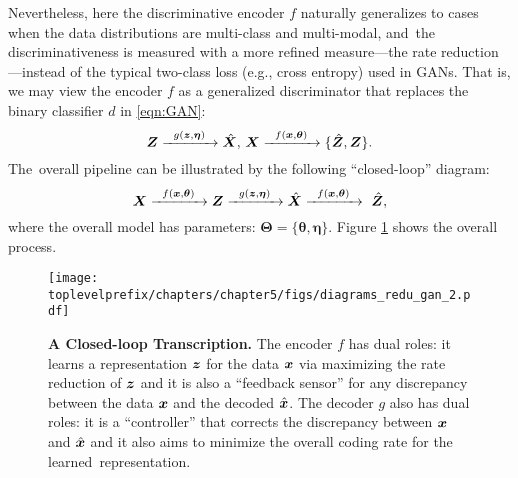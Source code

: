 \documentclass[../../book-main.tex]{subfiles}
\begin{document}
{Nevertheless, here the  discriminative encoder $f$ naturally generalizes to cases when the data distributions are multi-class and multi-modal, and~the discriminativeness is measured with a more refined measure---the rate reduction---instead of the typical two-class loss (e.g., cross entropy) used in GANs. That is, we may view the encoder $f$ as a generalized discriminator that replaces the binary classifier $d$ in \eqref{eqn:GAN}:
\begin{equation}
 \bm{Z} \xrightarrow{\hspace{2mm} g(\bm{z},\bm \eta) \hspace{2mm}} \hat {\bm{X}}, \, \bm{X} \xrightarrow{\hspace{2mm} f(\bm{x}, \bm \theta)\hspace{2mm}} \{\hat {\bm{Z}}, \bm{Z}\}.
 \label{eqn:closed-loop-GAN}
\end{equation}
The~overall pipeline can be illustrated by the following ``closed-loop''  diagram:}
\begin{equation}
    \bm{X} \xrightarrow{\hspace{2mm} f(\bm{x}, \bm \theta)\hspace{2mm}} \bm{Z} \xrightarrow{\hspace{2mm} g(\bm{z},\bm \eta) \hspace{2mm}} \hat {\bm{X}} \xrightarrow{\hspace{2mm} f(\bm{x}, \bm \theta)\hspace{2mm}} \ \hat {\bm{Z}}, 
\end{equation}
where the overall model has parameters: $\bm \Theta = \{\bm \theta, \bm \eta\}$. Figure \ref{fig:auto-encoding-closed} shows the overall process.  

\begin{figure}[t]
{\texttt{[image: \\toplevelprefix/chapters/chapter5/figs/diagrams\_redu\_gan\_2.pdf]}}
\caption{{\bf %
 A Closed-loop Transcription.} The encoder $f$ has dual roles: it learns a representation $\bm{z}$ for the data $\bm{x}$ via maximizing the rate reduction of $\bm{z}$ and it is also a ``feedback sensor'' for any discrepancy between the data $\bm{x}$ and the decoded $\hat {\bm{x}}$. The decoder $g$ also has dual roles: it is a ``controller'' that corrects the  discrepancy between $\bm{x}$ and $\hat {\bm{x}}$ and it also aims to minimize the overall coding rate for the learned~representation.} \label{fig:auto-encoding-closed} 
\end{figure}
\end{document}
